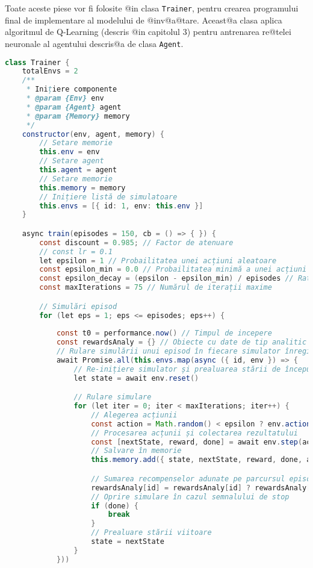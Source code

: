 Toate aceste piese vor fi folosite @in clasa \texttt{Trainer}, pentru crearea programului final de implementare al modelului de @inv@a@tare. Aceast@a clasa aplica algoritmul de Q-Learning (descris @in capitolul 3) pentru antrenarea re@telei neuronale al agentului descris@a de clasa \texttt{Agent}.

\begin{lstlisting}[language=Java, caption={Structura clasei Trainer}]
class Trainer {
    totalEnvs = 2
    /**
     * Inițiere componente
     * @param {Env} env 
     * @param {Agent} agent 
     * @param {Memory} memory
     */
    constructor(env, agent, memory) {
        // Setare memorie
        this.env = env
        // Setare agent
        this.agent = agent
        // Setare memorie
        this.memory = memory
        // Inițiere listă de simulatoare
        this.envs = [{ id: 1, env: this.env }]
    }

    async train(episodes = 150, cb = () => { }) {
        const discount = 0.985; // Factor de atenuare
        // const lr = 0.1
        let epsilon = 1 // Probailitatea unei acțiuni aleatoare
        const epsilon_min = 0.0 // Probailitatea minimă a unei acțiuni aleatoare
        const epsilon_decay = (epsilon - epsilon_min) / episodes // Rata de scădere a probabilității
        const maxIterations = 75 // Numărul de iterații maxime

        // Simulări episod
        for (let eps = 1; eps <= episodes; eps++) {
        
            const t0 = performance.now() // Timpul de incepere
            const rewardsAnaly = {} // Obiecte cu date de tip analitic
            // Rulare simulării unui episod în fiecare simulator înregistrat în listă
            await Promise.all(this.envs.map(async ({ id, env }) => {
                // Re-inițiere simulator și prealuarea stării de început
                let state = await env.reset()

                // Rulare simulare
                for (let iter = 0; iter < maxIterations; iter++) {
                    // Alegerea acțiunii
                    const action = Math.random() < epsilon ? env.actionSample() : this.agent.getAction(state)
                    // Procesarea acțunii și colectarea rezultatului
                    const [nextState, reward, done] = await env.step(action)
                    // Salvare în memorie
                    this.memory.add({ state, nextState, reward, done, action })

                    // Sumarea recompenselor adunate pe parcursul episodului
                    rewardsAnaly[id] = rewardsAnaly[id] ? rewardsAnaly[id] + reward : reward
                    // Oprire simulare în cazul semnalului de stop
                    if (done) {
                        break
                    }
                    // Prealuare stării viitoare
                    state = nextState
                }
            }))


\end{lstlisting}
